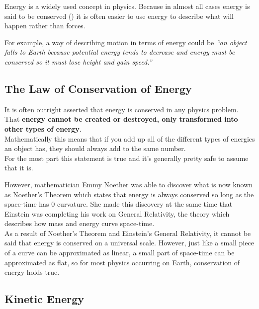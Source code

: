 \documentclass[main.tex]{subfiles}
\begin{document}
                Energy is a widely used concept in physics. Because in almost all cases energy is said to be conserved () it is often easier to use energy to describe what will happen rather than forces. 
                
                For example, a way of describing motion in terms of energy could be \textit{``an object falls to Earth because potential energy tends to decrease and energy must be conserved so it must lose height and gain speed.''}

                \subsection{The Law of Conservation of Energy}
                    \label{subsec: Conservation of Energy}

                    It is often outright asserted that energy is conserved in any physics problem. That \textbf{energy cannot be created or destroyed, only transformed into other types of energy}.\\
                    Mathematically this means that if you add up all of the different types of energies an object has, they should always add to the same number.\\
                    For the most part this statement is true and it's generally pretty safe to assume that it is.
                    

                    However, mathematician Emmy Noether was able to discover what is now known as Noether's Theorem which states that energy is always conserved so long as the space-time has 0 curvature. She made this discovery at the same time that Einstein was completing his work on General Relativity, the theory which describes how mass and energy curve space-time.\\
                    As a result of Noether's Theorem and Einstein's General Relativity, it cannot be said that energy is conserved on a universal scale. However, just like a small piece of a curve can be approximated as linear, a small part of space-time can be approximated as flat, so for most physics occurring on Earth, conservation of energy holds true.

                \subsection{Kinetic Energy}
                    \label{subsec: Kinetic Energy}
\end{document}
